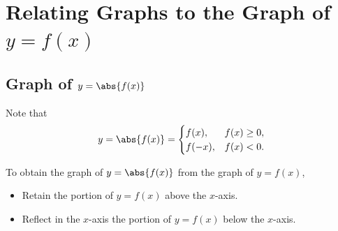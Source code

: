 \section{Relating Graphs to the Graph of \texorpdfstring{$y = f(x)$}{y = f(x)}}

\subsection{Graph of \texorpdfstring{$y = \abs{f(x)}$}{y = |f(x)|}}

Note that \[y = \abs{f(x)} = \begin{cases}
    f(x), & f(x) \geq 0,\\
    f(-x), & f(x) < 0.
\end{cases}\]

\begin{recipe}[Graph of $y = \abs{f(x)}$]
    To obtain the graph of $y = \abs{f(x)}$ from the graph of $y = f(x)$,
    \begin{itemize}
        \item Retain the portion of $y = f(x)$ above the $x$-axis.
        \item Reflect in the $x$-axis the portion of $y = f(x)$ below the $x$-axis.
    \end{itemize}
\end{recipe}

